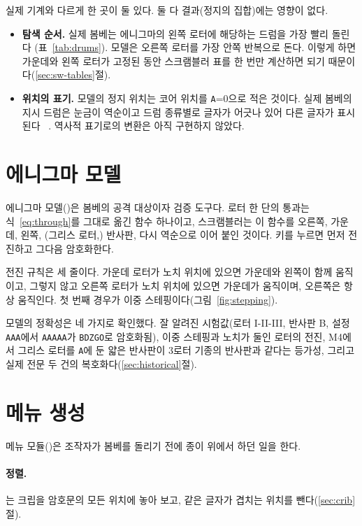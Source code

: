 실제 기계와 다르게 한 곳이 둘 있다. 둘 다 결과(정지의 집합)에는 영향이 없다.

\begin{itemize}
\item \textbf{탐색 순서.} 실제 봄베는 에니그마의 왼쪽 로터에 해당하는 드럼을 가장 빨리 돌린다%
(표~\ref{tab:drums}). 모델은 오른쪽 로터를 가장 안쪽 반복으로 돈다. 이렇게 하면 가운데와 왼쪽 로터가
고정된 동안 스크램블러 표를 한 번만 계산하면 되기 때문이다(\ref{sec:sw-tables}절).
\item \textbf{위치의 표기.} 모델의 정지 위치는 코어 위치를 \texttt{A}=0으로 적은 것이다. 실제 봄베의
지시 드럼은 눈금이 역순이고 드럼 종류별로 글자가 어긋나 있어 다른 글자가 표시된다%
~\cite{sale-ringstellung,ekhall-hallenberg-tutorial}. 역사적 표기로의 변환은 아직 구현하지 않았다.
\end{itemize}

\section{에니그마 모델}

에니그마 모델()은 봄베의 공격 대상이자 검증 도구다. 로터 한 단의 통과는
식~\eqref{eq:through}를 그대로 옮긴 함수 하나이고, 스크램블러는 이 함수를 오른쪽, 가운데, 왼쪽,
(그리스 로터,) 반사판, 다시 역순으로 이어 붙인 것이다. 키를 누르면 먼저 전진하고 그다음 암호화한다.

전진 규칙은 세 줄이다. 가운데 로터가 노치 위치에 있으면 가운데와 왼쪽이 함께 움직이고, 그렇지 않고
오른쪽 로터가 노치 위치에 있으면 가운데가 움직이며, 오른쪽은 항상 움직인다. 첫 번째 경우가 이중
스테핑이다(그림~\ref{fig:stepping}).

모델의 정확성은 네 가지로 확인했다. 잘 알려진 시험값(로터 I-II-III, 반사판 B, 설정 \texttt{AAA}에서
\texttt{AAAAA}가 \texttt{BDZGO}로 암호화됨), 이중 스테핑과 노치가 둘인 로터의 전진, M4에서 그리스 로터를
\texttt{A}에 둔 얇은 반사판이 3로터 기종의 반사판과 같다는 등가성, 그리고 실제 전문 두 건의
복호화다(\ref{sec:historical}절).

\section{메뉴 생성}

메뉴 모듈()은 조작자가 봄베를 돌리기 전에 종이 위에서 하던 일을 한다.

\paragraph{정렬.} 는 크립을 암호문의 모든 위치에 놓아 보고, 같은 글자가 겹치는
위치를 뺀다(\ref{sec:crib}절).

